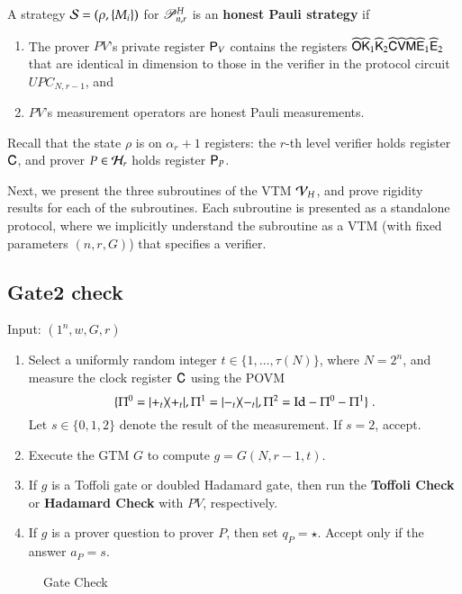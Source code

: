 A strategy $\mathcal{S} = (\rho,\{M_i\})$ for $\mathscr{P}_{n,r}^H$ is an \textbf{honest Pauli strategy} if
\begin{enumerate}
	\item The prover $PV$'s private register ${\mathsf{P}}_V$ contains the registers $\widehat{{\mathsf{O}}} \widehat{{\mathsf{K}}}_1 \widehat{{\mathsf{K}}}_2 \widehat{{\mathsf{C}}} \widehat{{\mathsf{V}}} \widehat{{\mathsf{M}}} \widehat{{\mathsf{E}}}_1 \widehat{{\mathsf{E}}}_2$ that are identical in dimension to those in the verifier in the protocol circuit $UPC_{N,r-1}$, and
	\item $PV$'s measurement operators are honest Pauli measurements.
\end{enumerate}
Recall that the state $\rho$ is on $\alpha_r + 1$ registers: the $r$-th level verifier holds register ${\mathsf{C}}$, and prover $P \in \mathcal H_r$ holds register ${\mathsf{P}}_P$.



\medskip
Next, we present the three subroutines of the VTM $\mathcal V_H$, and prove rigidity results for each of the subroutines. Each subroutine is presented as a standalone protocol, where we implicitly understand the subroutine as a VTM (with fixed parameters $(n,r,G)$) that specifies a verifier. 



\subsection{Gate2 check}
\label{sec:prop_check}


\vspace{10pt}
\begin{center}
\begin{mdframed}
    Input: $(1^n,w,G,r)$
	\begin{enumerate}
		\item Select a uniformly random integer $t\in\{1,\ldots, \tau(N)\}$, where $N = 2^n$, and measure the clock register ${\mathsf{C}}$ using the POVM 
\[
	\{ 	\Pi^0 = |+_t\rangle\! \langle +_t|, 
	\Pi^1 = |-_t\rangle\! \langle -_t|, 
	\Pi^2 = \mathop{\mathrm{Id}}\!\mathinner{} - \Pi^0 - \Pi^1 \}\;.
\]	
Let $s \in \{0,1,2\}$ denote the result of the measurement. If $s = 2$, accept.
	\item Execute the GTM $G$ to compute $g = G(N,r-1,t)$. 
	\item If $g$ is a Toffoli gate or doubled Hadamard gate, then run the \textbf{Toffoli Check} or \textbf{Hadamard Check} with $PV$, respectively. 
	\item If $g$ is a prover question to prover $P$, then set $q_P = \star$. Accept only if the answer $a_P = s$.

	\end{enumerate}    
\end{mdframed}

\end{center}
\begin{figure}[H]
\caption{Gate Check}
\label{fig:prop_check}
\end{figure}

